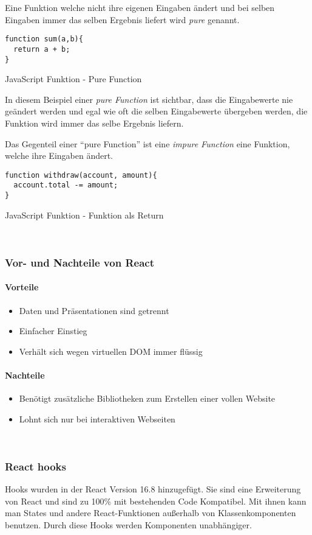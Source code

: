  Eine Funktion welche nicht ihre eigenen Eingaben ändert und bei selben Eingaben immer das selben 
 Ergebnis liefert wird \textit{pure} genannt.
\begin{code}[htp]
\begin{lstlisting}
function sum(a,b){
  return a + b;
}
\end{lstlisting}
\caption{JavaScript Funktion - Pure Function}
\end{code}
In diesem Beispiel einer \textit{pure Function} ist sichtbar, dass die Eingabewerte nie geändert werden und egal 
wie oft die selben Eingabewerte übergeben werden, die Funktion wird immer das selbe Ergebnis liefern.


Das Gegenteil einer ``pure Function'' ist eine \textit{impure Function} eine Funktion, welche ihre Eingaben ändert.
\begin{code}[htp]
\begin{lstlisting}
function withdraw(account, amount){
  account.total -= amount;
}
\end{lstlisting}
\caption{JavaScript Funktion - Funktion als Return}
\end{code}
~\cite{Props}
\subsubsection{Vor- und Nachteile von React}
\paragraph{Vorteile}
\begin{itemize}
	\item Daten und Präsentationen sind getrennt
	\item Einfacher Einstieg
	\item Verhält sich wegen virtuellen DOM immer flüssig
\end{itemize}
\paragraph{Nachteile}
\begin{itemize}
	\item Benötigt zusätzliche Bibliotheken zum Erstellen einer vollen Website
	\item Lohnt sich nur bei interaktiven Webseiten
\end{itemize}~\cite{ReactVor-undNachteile}

\subsubsection{React hooks}
Hooks wurden in der React Version 16.8 hinzugefügt. Sie sind eine Erweiterung von React und sind 
zu 100\% mit bestehenden Code Kompatibel. Mit ihnen kann man States und andere React-Funktionen außerhalb 
von Klassenkomponenten benutzen. Durch diese Hooks werden Komponenten unabhängiger. 


